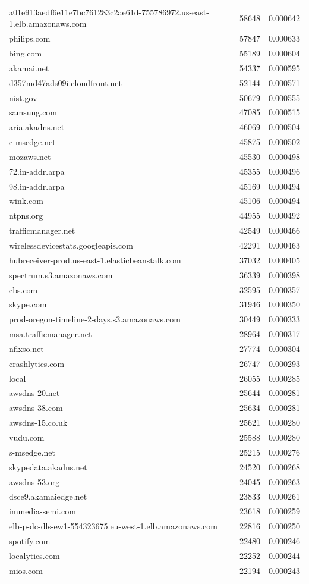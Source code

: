 \begin{tabular}{lrr}
a01e913aedf6e11e7bc761283c2ae61d-755786972.us-east-1.elb.amazonaws.com & 58648 & 0.000642 \\
philips.com & 57847 & 0.000633 \\
bing.com & 55189 & 0.000604 \\
akamai.net & 54337 & 0.000595 \\
d357md47ads09i.cloudfront.net & 52144 & 0.000571 \\
nist.gov & 50679 & 0.000555 \\
samsung.com & 47085 & 0.000515 \\
aria.akadns.net & 46069 & 0.000504 \\
c-msedge.net & 45875 & 0.000502 \\
mozaws.net & 45530 & 0.000498 \\
72.in-addr.arpa & 45355 & 0.000496 \\
98.in-addr.arpa & 45169 & 0.000494 \\
wink.com & 45106 & 0.000494 \\
ntpns.org & 44955 & 0.000492 \\
trafficmanager.net & 42549 & 0.000466 \\
wirelessdevicestats.googleapis.com & 42291 & 0.000463 \\
hubreceiver-prod.us-east-1.elasticbeanstalk.com & 37032 & 0.000405 \\
spectrum.s3.amazonaws.com & 36339 & 0.000398 \\
cbs.com & 32595 & 0.000357 \\
skype.com & 31946 & 0.000350 \\
prod-oregon-timeline-2-days.s3.amazonaws.com & 30449 & 0.000333 \\
msa.trafficmanager.net & 28964 & 0.000317 \\
nflxso.net & 27774 & 0.000304 \\
crashlytics.com & 26747 & 0.000293 \\
local & 26055 & 0.000285 \\
awsdns-20.net & 25644 & 0.000281 \\
awsdns-38.com & 25634 & 0.000281 \\
awsdns-15.co.uk & 25621 & 0.000280 \\
vudu.com & 25588 & 0.000280 \\
s-msedge.net & 25215 & 0.000276 \\
skypedata.akadns.net & 24520 & 0.000268 \\
awsdns-53.org & 24045 & 0.000263 \\
dsce9.akamaiedge.net & 23833 & 0.000261 \\
immedia-semi.com & 23618 & 0.000259 \\
elb-p-dc-dls-ew1-554323675.eu-west-1.elb.amazonaws.com & 22816 & 0.000250 \\
spotify.com & 22480 & 0.000246 \\
localytics.com & 22252 & 0.000244 \\
mios.com & 22194 & 0.000243 \\
\bottomrule
\end{tabular}
